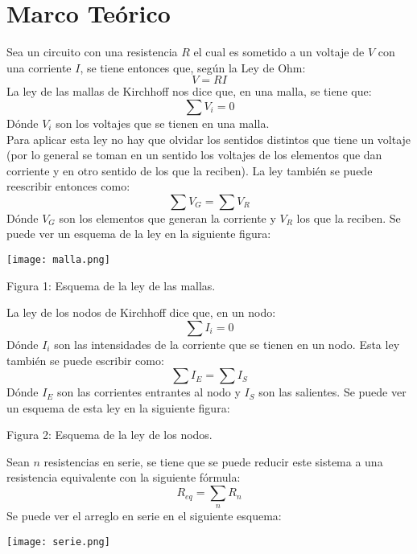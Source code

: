 \documentclass{article}
\begin{document}
\section{Marco Te\'orico}
Sea un circuito con una resistencia $R$ el cual es sometido a un voltaje de $V$ con una corriente $I$, se tiene entonces que, seg\'un la Ley de Ohm:
\begin{equation}
V=RI
\end{equation}
La ley de las mallas de Kirchhoff nos dice que, en una malla, se tiene que:
\begin{equation}
\sum V_i=0
\end{equation}
D\'onde $V_i$ son los voltajes que se tienen en una malla. \\ 
Para aplicar esta ley no hay que olvidar los sentidos distintos que tiene un voltaje (por lo general se toman en un sentido los voltajes de los elementos que dan corriente y en otro sentido de los que la reciben). La ley tambi\'en se puede reescribir entonces como:
\begin{equation}
\sum V_G=\sum V_R
\end{equation}
D\'onde $V_G$ son los elementos que generan la corriente y $V_R$ los que la reciben.
Se puede ver un esquema de la ley en la siguiente figura:
\begin{center}
\texttt{[image: malla.png]}
\end{center}
\begin{center}
Figura 1: Esquema de la ley de las mallas.
\end{center}

La ley de los nodos de Kirchhoff dice que, en un nodo:
\begin{equation}
\sum I_i=0
\end{equation}
D\'onde $I_i$ son las intensidades de la corriente que se tienen en un nodo. Esta ley tambi\'en se puede escribir como:
\begin{equation}
\sum I_E=\sum I_S
\end{equation}
D\'onde $I_E$ son las corrientes entrantes al nodo y $I_S$ son las salientes.
Se puede ver un esquema de esta ley en la siguiente figura:
\vspace{5cm}
\begin{center}
Figura 2: Esquema de la ley de los nodos.
\end{center}

Sean $n$ resistencias en serie, se tiene que se puede reducir este sistema a una resistencia equivalente con la siguiente f\'ormula:
\begin{equation}
R_{eq}=\sum _n R_n
\end{equation}
Se puede ver el arreglo en serie en el siguiente esquema:
\begin{center}
\texttt{[image: serie.png]}
\end{center}
\end{document}
